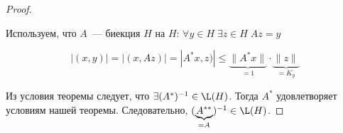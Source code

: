 \begin{proof}
\begin{itemize}
        Используем, что $A$~--- биекция $H$ на $H$: $\forall y \in H \; \exists z \in H \; Az = y$

        \[ |(x, y)| = |(x, Az)| = |A^*x, z)| \leq \underbrace{\|A^* x\|}_{=1} \cdot \underbrace{\|z\|}_{=K_y}\]
    \end{itemize}
    
    Из условия теоремы следует, что $\exists (A^*)^{-1} \in \L(H)$.
    Тогда $A^*$ удовлетворяет условиям нашей теоремы.
    Следовательно, $(\underbrace{A^{**}}_{=A})^{-1} \in \L(H)$.
\end{proof}